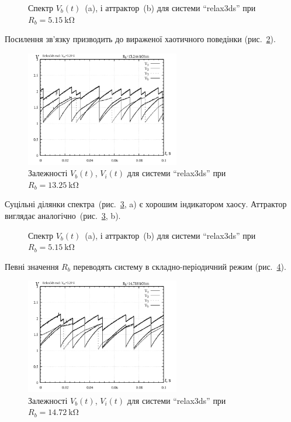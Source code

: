 \begin{figure}[htb!]
  \caption{Спектр $V_b(t)$~(a), і аттрактор~(b) для системи ``relax3ds'' при $ R_b = \SI{5.15}{\kilo \ohm} $}
\label{atu:f:relax3ds_f_05151}
\end{figure}

Посилення зв'язку призводить до вираженої хаотичного поведінки
(рис.~\ref{atu:f:relax3ds_t_13246}).

\begin{figure}[htb!]
  \centerline{\includegraphics[width=0.6\textwidth]{p/relax3ds_t_013246.png} }
  \caption{Залежності $V_b(t)$, $V_i(t)$ для системи ``relax3ds'' при $R_b = \SI{13.25}{\kilo\ohm} $}
  \label{atu:f:relax3ds_t_13246}
\end{figure}

Суцільні ділянки спектра~(рис.~\ref{atu:f:relax3ds_f_13246}, a)
є хорошим індикатором хаосу. Аттрактор виглядає
аналогічно~(рис.~\ref{atu:f:relax3ds_f_13246}, b).

\begin{figure}[htb!]
  \caption{Спектр $V_b(t)$~(a), і аттрактор~(b) для системи ``relax3ds'' при $R_b=\SI{5.15}{\kilo \ohm} $}
  \label{atu:f:relax3ds_f_13246}
\end{figure}

Певні значення
$R_b$ переводять систему в складно-періодичний режим (рис.~\ref{atu:f:relax3ds_t_14718}).

\begin{figure}[htb!]
  \centerline{\includegraphics[width=0.6\textwidth]{p/relax3ds_t_014718.png} }
  \caption{Залежності $V_b(t)$, $V_i(t)$ для системи ``relax3ds'' при $R_b=\SI{14.72}{\kilo\ohm} $}
  \label{atu:f:relax3ds_t_14718}
\end{figure}

